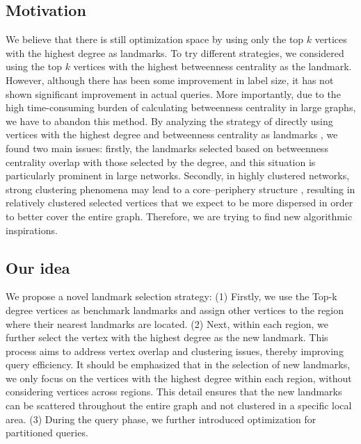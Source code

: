 \documentclass[sigconf]{acmart}
\begin{document}
\subsection{Motivation}
We believe that there is still optimization space by using only the top $k$ vertices with the highest degree as landmarks. To try different strategies, we considered using the top $k$ vertices with the highest betweenness centrality as the landmark. However, although there has been some improvement in label size, it has not shown significant improvement in actual queries. More importantly, due to the high time-consuming burden of calculating betweenness centrality in large graphs, we have to abandon this method. By analyzing the strategy of directly using vertices with the highest degree and betweenness centrality as landmarks \cite{ref6, ref7, ref8}, we found two main issues: firstly, the landmarks selected based on betweenness centrality overlap with those selected by the degree, and this situation is particularly prominent in large networks. Secondly, in highly clustered networks, strong clustering phenomena may lead to a core–periphery structure \cite{ref4, ref17}, resulting in relatively clustered selected vertices that we expect to be more dispersed in order to better cover the entire graph. Therefore, we are trying to find new algorithmic inspirations.


\subsection{Our idea}
We propose a novel landmark selection strategy: (1) Firstly, we use the Top-k degree vertices as benchmark landmarks and assign other vertices to the region where their nearest landmarks are located. (2) Next, within each region, we further select the vertex with the highest degree as the new landmark. This process aims to address vertex overlap and clustering issues, thereby improving query efficiency. It should be emphasized that in the selection of new landmarks, we only focus on the vertices with the highest degree within each region, without considering vertices across regions. This detail ensures that the new landmarks can be scattered throughout the entire graph and not clustered in a specific local area. (3) During the query phase, we further introduced optimization for partitioned queries.
\end{document}
